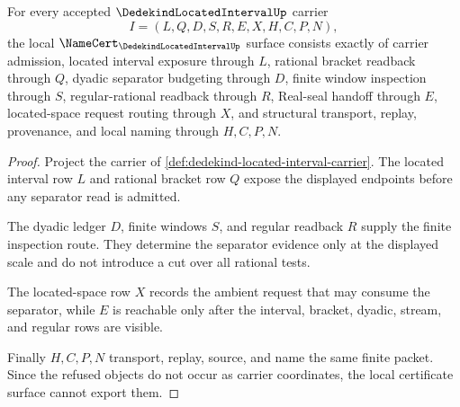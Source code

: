 \begin{theorem}
\label{thm:dedekind-located-interval-namecert-obligations}
For every accepted $\DedekindLocatedIntervalUp$ carrier
$$
I=(L,Q,D,S,R,E,X,H,C,P,N),
$$
the local $\NameCert_{\DedekindLocatedIntervalUp}$ surface consists exactly of carrier admission, located interval exposure through $L$, rational bracket readback through $Q$, dyadic separator budgeting through $D$, finite window inspection through $S$, regular-rational readback through $R$, Real-seal handoff through $E$, located-space request routing through $X$, and structural transport, replay, provenance, and local naming through $H,C,P,N$.
\end{theorem}
\begin{proof}
Project the carrier of \autoref{def:dedekind-located-interval-carrier}. The located interval row $L$ and rational bracket row $Q$ expose the displayed endpoints before any separator read is admitted.

The dyadic ledger $D$, finite windows $S$, and regular readback $R$ supply the finite inspection route. They determine the separator evidence only at the displayed scale and do not introduce a cut over all rational tests.

The located-space row $X$ records the ambient request that may consume the separator, while $E$ is reachable only after the interval, bracket, dyadic, stream, and regular rows are visible.

Finally $H,C,P,N$ transport, replay, source, and name the same finite packet. Since the refused objects do not occur as carrier coordinates, the local certificate surface cannot export them.
\end{proof}

